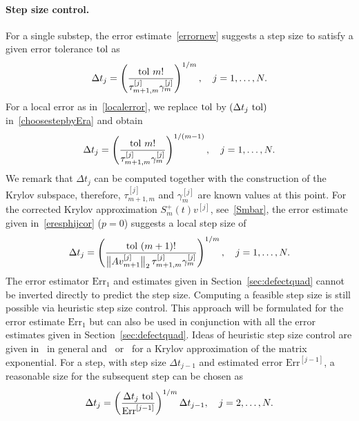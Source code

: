 \documentclass[smallextended]{svjour3pre}%
\numberwithin{equation}{section}
\numberwithin{figure}{section}
\numberwithin{table}{section}
\newcommand{\ttol}{{\rm tol}}
\newcommand\tjnew[1]{{#1}}
\newcommand\Erone{\mathrm{Err}_1}
\newcommand\Er{\mathrm{Err}}
\newcommand\mv[1]{v^{[#1]}}
\newcommand\mvmone[1]{v^{[#1]}_{m+1}}
\newcommand\Scor{{S}^+}
\newcommand\Opgen{A}
\begin{document}
\paragraph{Step size control.}
For a single substep, the error estimate~\eqref{errornew}
suggests a step size to satisfy a given error tolerance $\ttol$ as
\begin{equation}\label{choosestepbyEra}
\Delta t_j = \left(\frac{\ttol\, \, m!}{\tau^{[j]}_{m+1,m}\gamma^{[j]}_m}\right)^{1/m},\quad j=1,\ldots,N.
\end{equation}
For a local error as in~\eqref{localerror}, we replace $\ttol$ by $ (\Delta t_j\,\,\ttol)$ in~\eqref{choosestepbyEra} and obtain
\begin{equation}\label{choosestepbyEralocal}
\Delta t_j = \left(\frac{\ttol\, \, m!}{\tau^{[j]}_{m+1,m}\gamma^{[j]}_m}\right)^{1/(m-1)},\quad j=1,\ldots,N.
\end{equation}
We remark that $\Delta t_j$ can be computed together with the construction of the Krylov subspace,
therefore, $\tau^{[j]}_{m+1,m}$ and $\gamma^{[j]}_m$ are known values at this point.
For the corrected Krylov approximation $\Scor_m(t)\mv{j}$, see~\eqref{Smbar}, the error estimate given in~\eqref{eresphijcor} ($p=0$) suggests a local step size of
\begin{equation}\label{eq:stepasymptoticcorrected}
\Delta t_j = \left(\frac{\ttol\, \, (m+1)!}{\big\|\Opgen\mvmone{j}\big\|_2\,\tau^{[j]}_{m+1,m}\gamma^{[j]}_m}\right)^{1/m},\quad j=1,\ldots,N.
\end{equation}
The error estimator $\Erone$ and estimates given in Section~\ref{sec:defectquad} cannot be inverted directly
to predict the step size.
Computing a feasible step size is still possible via heuristic step size control.
This approach will be formulated for the error estimate $\Erone$ but can also be used in conjunction with all the error estimates given in Section~\ref{sec:defectquad}.
Ideas of heuristic step size control are given in~\cite{Gust91} in general and~\cite{sidje98} or~\cite{niewri12}
for a Krylov approximation of the matrix exponential.
For a step, with step size $\Delta t_{j-1}$ and estimated error $\Er^{[j-1]}$, a reasonable size for the
subsequent step can be chosen as
\begin{equation}\label{heuristicstepsize}
\Delta t_{j} = \left( \frac{\tjnew{\Delta t_{j}}\,\,\ttol}{\Er^{[j-1]}}\right)^{1/m} \Delta t_{j-1},\quad j=2,\ldots,N.
\end{equation}
\end{document}
